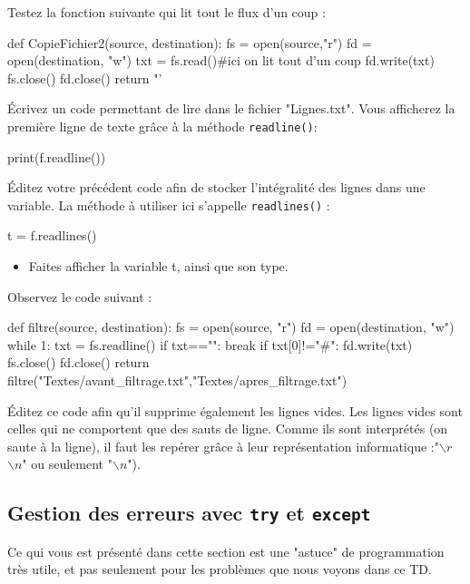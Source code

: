 Testez la fonction suivante qui lit tout le flux d'un coup :
\begin{python}
def CopieFichier2(source, destination):
  fs = open(source,"r")
  fd = open(destination, "w")
  txt = fs.read()#ici on lit tout d'un coup
  fd.write(txt)
  fs.close()
  fd.close()
  return "'%
\end{python}
\exer
 Écrivez un code permettant de lire dans le fichier "Lignes.txt". Vous afficherez la première ligne de texte grâce à la méthode \texttt{readline()}:

\begin{python}
print(f.readline())
\end{python}

Éditez votre précédent code afin de stocker l'intégralité des lignes dans une
variable. La méthode à utiliser ici s'appelle  \texttt{readlines()} :

\begin{python}
t = f.readlines()
\end{python}

\begin{itemize}
 \item Faites afficher la variable t, ainsi que son type.
\end{itemize}

\exer

 Observez le code suivant :

\begin{python}
def filtre(source, destination):
  fs = open(source, "r")
  fd = open(destination, "w")
  while 1:
    txt = fs.readline()
    if txt=="":
      break
    if txt[0]!="#":
      fd.write(txt)
  fs.close()
  fd.close()
  return
filtre("Textes/avant_filtrage.txt","Textes/apres_filtrage.txt")
\end{python}

 Éditez ce code afin qu'il supprime également les lignes vides. Les lignes vides sont celles qui ne comportent que des sauts de ligne. Comme ils sont interprétés (on saute à la ligne), il faut les repérer grâce à leur représentation informatique :"$\backslash r$$\backslash n$" ou seulement "$\backslash n$"). %

\subsection{Gestion des erreurs avec \texttt{try} et \texttt{except}}
 Ce qui vous est présenté dans cette section est une "astuce" de programmation très utile, et pas seulement pour les problèmes que nous voyons dans ce TD.

